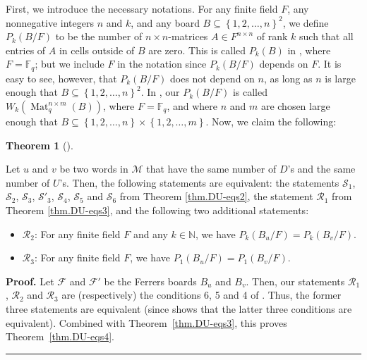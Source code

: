 \documentclass[numbers=enddot,12pt,final,onecolumn,notitlepage]{scrartcl}%
\theoremstyle{definition}
\newtheorem{theo}{Theorem}[section]
\newenvironment{theorem}[1][]
{\begin{theo}[#1]\begin{leftbar}}
{\end{leftbar}\end{theo}}
\newenvironment{proof}[1][Proof]{\noindent\textbf{#1.} }{\ \rule{0.5em}{0.5em}}
\newcommand{\M}{\mathcal{M}}
\newcommand{\NN}{\mathbb{N}}
\newcommand{\set}[1]{\left\{ #1 \right\}}
\newcommand{\tup}[1]{\left( #1 \right)}
\newenvironment{vershort}{}{}
\begin{document}
First, we introduce the necessary notations.
For any finite field $F$, any nonnegative integers $n$ and $k$, and any board
$B \subseteq \set{1, 2, \ldots, n}^2$, we define $P_k \tup{B / F}$
to be the number of $n \times n$-matrices $A \in F^{n \times n}$ of
rank $k$ such that all entries of $A$ in cells outside of $B$ are zero.
This is called $P_k \tup{B}$ in \cite[Definition 1]{Haglun98}, where
$F = \mathbb{F}_q$; but we include $F$ in the notation since
$P_k \tup{B / F}$ depends on $F$. It is easy to see, however, that
$P_k \tup{B / F}$ does not depend on $n$,
as long as $n$ is large enough that $B \subseteq \set{1, 2, \ldots, n}^2$.
In \cite{CoGrRa23}, our $P_k \tup{B / F}$ is called
$W_k\tup{\operatorname{Mat}^{n\times m}_q\tup{B}}$, where $F = \mathbb{F}_q$,
and where $n$ and $m$ are chosen large enough that
$B \subseteq \set{1,2,\ldots,n} \times \set{1,2,\ldots,m}$.
Now, we claim the following:

\begin{theorem}
\label{thm.DU-eqs4}
Let $u$ and $v$ be two words in $\M$ that have the
same number of $D$'s and the same number of $U$'s. Then, the following
statements are equivalent:
the statements $\mathcal{S}_{1}$, $\mathcal{S}_{2}$, $\mathcal{S}_{3}$, $\mathcal{S}'_3$, $\mathcal{S}_{4}$, $\mathcal{S}_{5}$ and $\mathcal{S}_6$ from Theorem \ref{thm.DU-eqs2},
the statement $\mathcal{R}_1$ from Theorem \ref{thm.DU-eqs3},
and the following two additional statements:

\begin{itemize}
\item $\mathcal{R}_2$: For any finite field $F$ and any $k\in\NN$, we
have $P_k \tup{B_u / F} = P_k \tup{B_v / F}$.

\item $\mathcal{R}_3$: For any finite field $F$, we have $P_1 \tup{B_u / F} = P_1 \tup{B_v / F}$.
\end{itemize}
\end{theorem}

\begin{vershort}
\begin{proof}
Let $\mathcal{F}$ and $\mathcal{F}'$ be the Ferrers boards $B_u$ and $B_v$.
Then, our statements $\mathcal{R}_1$, $\mathcal{R}_2$ and $\mathcal{R}_3$ are (respectively) the conditions 6, 5 and 4 of \cite[Corollary 3.2]{CoGrRa23}.
Thus, the former three statements are equivalent (since \cite[Corollary 3.2]{CoGrRa23} shows that the latter three conditions are equivalent).
Combined with Theorem~\ref{thm.DU-eqs3}, this proves Theorem~\ref{thm.DU-eqs4}.
\end{proof}
\end{vershort}
\end{document}
